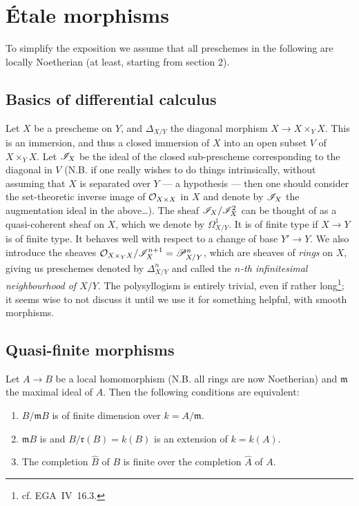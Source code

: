 \setcounter{chapter}{0}
\chapter{Étale morphisms}

To simplify the exposition we assume that all preschemes in the following are locally Noetherian (at least, starting from section 2).


\section{Basics of differential calculus}

Let $X$ be a prescheme on $Y$, and $\Delta_{X/Y}$ the diagonal morphism $X\to X\times_Y X$.
This is an immersion, and thus a closed immersion of $X$ into an open subset $V$ of $X\times_Y X$.
Let $\mathscr{I}_X$ be the ideal of the closed sub-prescheme corresponding to the diagonal in $V$ (N.B. if one really wishes to do things intrinsically, without assuming that $X$ is separated over $Y$ — a  hypothesis — then one should consider the set-theoretic inverse image of $\mathcal{O}_{X\times X}$ in $X$ and denote by $\mathscr{I}_X$ the augmentation ideal in the above\ldots).
The sheaf $\mathscr{I}_X/\mathscr{I}_X^2$ can be thought of as a quasi-coherent sheaf on $X$, which we denote by $\Omega_{X/Y}^1$.
It is of finite type if $X\to Y$ is of finite type.
It behaves well with respect to a change of base $Y'\to Y$.
We also introduce the sheaves $\mathcal{O}_{X\times_Y X}/\mathscr{I}_X^{n+1}=\mathscr{P}^n_{X/Y}$, which are sheaves of \emph{rings} on $X$, giving us preschemes denoted by $\Delta_{X/Y}^n$ and called the \emph{$n$-th infinitesimal neighbourhood of $X/Y$}.
The polysyllogism is entirely trivial, even if rather long\footnote{cf. EGA~IV~16.3.}; it seems wise to not discuss it until we use it for something helpful, with smooth morphisms.


\section{Quasi-finite morphisms}

\begin{prop}
    Let $A\to B$ be a local homomorphism (N.B. all rings are now Noetherian) and $\mathfrak{m}$ the maximal ideal of $A$.
    Then the following conditions are equivalent:
    \begin{enumerate}[\normalfont(i)]
        \item $B/\mathfrak{m}B$ is of finite dimension over $k=A/\mathfrak{m}$.
        \item $\mathfrak{m}B$ is \unsure{[\ldots]} and $B/\mathfrak{r}(B)=k(B)$ is an extension of $k=k(A)$.
        \item The completion $\hat{B}$ of $B$ is finite over the completion $\hat{A}$ of $A$.
    \end{enumerate}
\end{prop}

